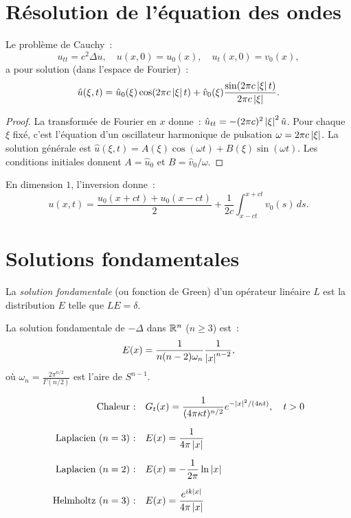 \section{R\'esolution de l'\'equation des ondes}

\begin{theoreme}
Le probl\`eme de Cauchy~:
\[
    u_{tt} = c^2 \Delta u, \quad u(x,0) = u_0(x), \quad u_t(x,0) = v_0(x),
\]
a pour solution (dans l'espace de Fourier)~:
\[
    \hat{u}(\xi, t) = \hat{u}_0(\xi) \cos(2\pi c \left| \xi \right| t)
    + \hat{v}_0(\xi) \frac{\sin(2\pi c \left| \xi \right| t)}{2\pi c \left| \xi \right|}.
\]
\end{theoreme}

\begin{proof}
La transform\'ee de Fourier en $x$ donne~:
$\hat{u}_{tt} = -(2\pi c)^2 \left| \xi \right|^2 \hat{u}$. Pour chaque $\xi$ fix\'e,
c'est l'\'equation d'un oscillateur harmonique de pulsation $\omega = 2\pi c \left| \xi \right|$.
La solution g\'en\'erale est $\hat{u}(\xi, t) = A(\xi)\cos(\omega t) + B(\xi)\sin(\omega t)$.
Les conditions initiales donnent $A = \hat{u}_0$ et $B = \hat{v}_0 / \omega$.
\end{proof}

\begin{exemple}[Formule de d'Alembert ($n = 1$)]
En dimension $1$, l'inversion donne~:
\[
    u(x,t) = \frac{u_0(x+ct) + u_0(x-ct)}{2} + \frac{1}{2c}\int_{x-ct}^{x+ct} v_0(s)\, ds.
\]
\end{exemple}

\section{Solutions fondamentales}

\begin{definition}
La \emph{solution fondamentale} (ou fonction de Green) d'un op\'erateur lin\'eaire
$L$ est la distribution $E$ telle que $LE = \delta$.
\end{definition}

\begin{exemple}
La solution fondamentale de $-\Delta$ dans $\mathbb{R}^n$ ($n \geq 3$) est~:
\[
    E(x) = \frac{1}{n(n-2)\omega_n} \frac{1}{\left| x \right|^{n-2}},
\]
o\`u $\omega_n = \frac{2\pi^{n/2}}{\Gamma(n/2)}$ est l'aire de $S^{n-1}$.
\end{exemple}

\begin{formules}[title=\textbf{Solutions fondamentales des EDP classiques}]
\begin{align*}
    \text{Chaleur~:} \quad & G_t(x) = \frac{1}{(4\pi \kappa t)^{n/2}}
        e^{-\left| x \right|^2/(4\kappa t)}, \quad t > 0 \\[6pt]
    \text{Laplacien ($n=3$)~:} \quad & E(x) = \frac{1}{4\pi \left| x \right|} \\[6pt]
    \text{Laplacien ($n=2$)~:} \quad & E(x) = -\frac{1}{2\pi}\ln\left| x \right| \\[6pt]
    \text{Helmholtz ($n=3$)~:} \quad & E(x) = \frac{e^{ik\left| x \right|}}{4\pi \left| x \right|}
\end{align*}
\end{formules}

